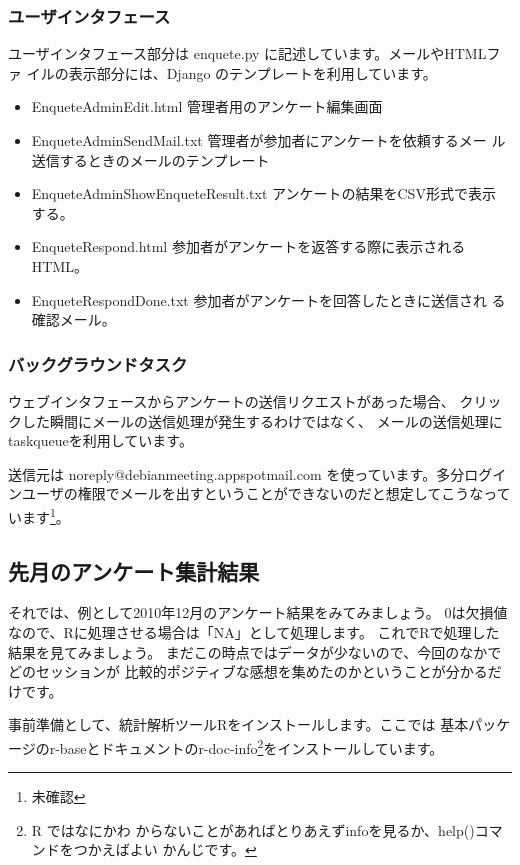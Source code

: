 \documentclass[mingoth,a4paper]{jsarticle}
\begin{document}
\subsubsection{ユーザインタフェース}

ユーザインタフェース部分は enquete.py に記述しています。メールやHTMLファ
イルの表示部分には、Django のテンプレートを利用しています。

\begin{itemize}
 \item EnqueteAdminEdit.html 管理者用のアンケート編集画面
 \item EnqueteAdminSendMail.txt 管理者が参加者にアンケートを依頼するメー
       ル送信するときのメールのテンプレート
 \item EnqueteAdminShowEnqueteResult.txt アンケートの結果をCSV形式で表示
       する。
 \item EnqueteRespond.html 参加者がアンケートを返答する際に表示される
       HTML。
 \item EnqueteRespondDone.txt 参加者がアンケートを回答したときに送信され
       る確認メール。
\end{itemize}

\subsubsection{バックグラウンドタスク}

ウェブインタフェースからアンケートの送信リクエストがあった場合、
クリックした瞬間にメールの送信処理が発生するわけではなく、
メールの送信処理にtaskqueueを利用しています。

送信元は noreply@debianmeeting.appspotmail.com を使っています。多分ログイ
ンユーザの権限でメールを出すということができないのだと想定してこうなって
います\footnote{未確認}。

\subsection{先月のアンケート集計結果}

それでは、例として2010年12月のアンケート結果をみてみましょう。
0は欠損値なので、Rに処理させる場合は「NA」として処理します。
これでRで処理した結果を見てみましょう。
まだこの時点ではデータが少ないので、今回のなかでどのセッションが
比較的ポジティブな感想を集めたのかということが分かるだけです。

事前準備として、統計解析ツールR\cite{r2008}をインストールします。ここでは
基本パッケージのr-baseとドキュメントのr-doc-info\footnote{R ではなにかわ
からないことがあればとりあえずinfoを見るか、help()コマンドをつかえばよい
かんじです。}をインストールしています。 
\end{document}
